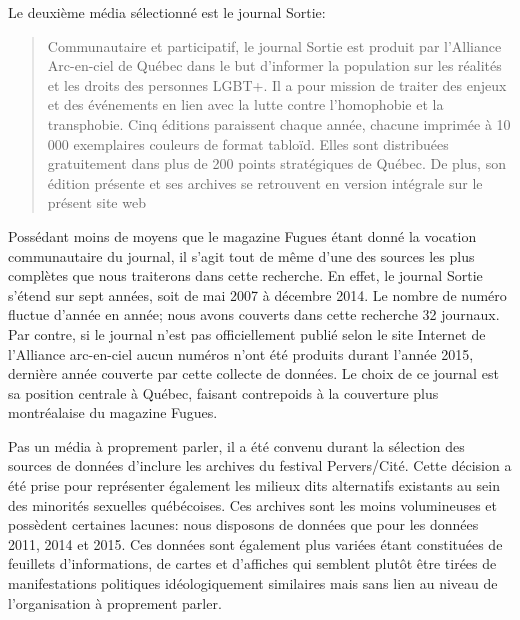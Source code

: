 

Le deuxième média sélectionné est le journal Sortie:
\blockquote[{\cite{AllianceArc2014}}][.]{ Communautaire et participatif, le journal Sortie est produit par l’Alliance Arc-en-ciel de Québec dans le but d’informer la population sur les réalités et les droits des personnes LGBT+.
  Il a pour mission de traiter des enjeux et des événements en lien avec la lutte contre l’homophobie et la transphobie. 
Cinq éditions paraissent chaque année, chacune imprimée à 10 000 exemplaires couleurs de format tabloïd. 
Elles sont distribuées gratuitement dans plus de 200 points stratégiques de Québec.
  De plus, son édition présente et ses archives se retrouvent en version intégrale sur le présent site web} 
Possédant moins de moyens que le magazine Fugues étant donné la vocation communautaire du journal, il s'agit tout de même d'une des sources les plus complètes que nous traiterons dans cette recherche.
En effet, le journal Sortie s'étend sur sept années, soit de mai 2007 à décembre 2014. 
Le nombre de numéro fluctue d'année en année; nous avons couverts dans cette recherche 32 journaux. 
Par contre, si le journal n'est pas officiellement publié selon le site Internet de l'Alliance arc-en-ciel aucun numéros n'ont été produits durant l'année 2015, dernière année couverte par cette collecte de données. 
Le choix de ce journal est sa position centrale à Québec, faisant contrepoids à la couverture plus montréalaise du magazine Fugues.

Pas un média à proprement parler, il a été convenu durant la sélection des sources de données d'inclure les archives du festival Pervers/Cité. 
Cette décision a été prise pour représenter également les milieux dits alternatifs existants au sein des minorités sexuelles québécoises. 
Ces archives sont les moins volumineuses et possèdent certaines lacunes: nous disposons de données que pour les données 2011, 2014 et 2015. 
Ces données sont également plus variées étant constituées de feuillets d'informations, de cartes et d'affiches qui semblent plutôt être tirées de manifestations politiques idéologiquement similaires mais sans lien au niveau de l'organisation à proprement parler.


